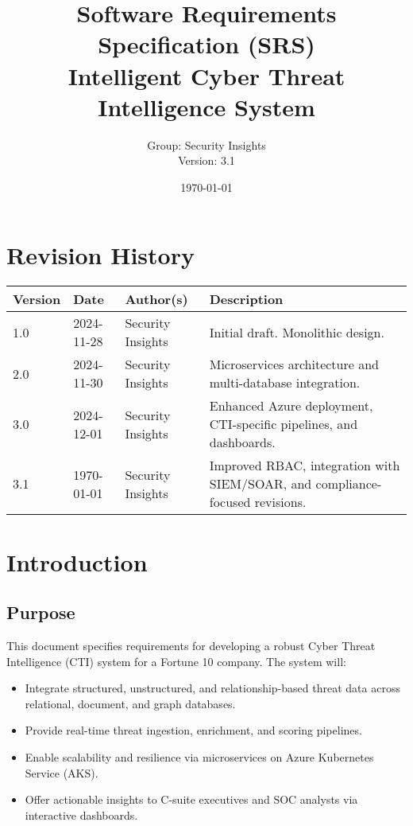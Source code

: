\documentclass[12pt]{article}
\title{Software Requirements Specification (SRS) \\ \vspace{1em} \Large Intelligent Cyber Threat Intelligence System}
\author{Group: Security Insights \\ Version: 3.1}
\date{\today}
\begin{document}
\maketitle
\thispagestyle{empty}

\newpage
\tableofcontents
\newpage

\section*{Revision History}
\begin{longtable}{|p{2cm}|p{3cm}|p{3cm}|p{5cm}|}
\hline
\textbf{Version} & \textbf{Date} & \textbf{Author(s)} & \textbf{Description} \\
\hline
1.0 & 2024-11-28 & Security Insights & Initial draft. Monolithic design. \\
\hline
2.0 & 2024-11-30 & Security Insights & Microservices architecture and multi-database integration. \\
\hline
3.0 & 2024-12-01 & Security Insights & Enhanced Azure deployment, CTI-specific pipelines, and dashboards. \\
\hline
3.1 & \today & Security Insights & Improved RBAC, integration with SIEM/SOAR, and compliance-focused revisions. \\
\hline
\end{longtable}

\newpage

\section{Introduction}
\subsection{Purpose}
This document specifies requirements for developing a robust Cyber Threat Intelligence (CTI) system for a Fortune 10 company. The system will:
\begin{itemize}
    \item Integrate structured, unstructured, and relationship-based threat data across relational, document, and graph databases.
    \item Provide real-time threat ingestion, enrichment, and scoring pipelines.
    \item Enable scalability and resilience via microservices on Azure Kubernetes Service (AKS).
    \item Offer actionable insights to C-suite executives and SOC analysts via interactive dashboards.
\end{itemize}
\end{document}
